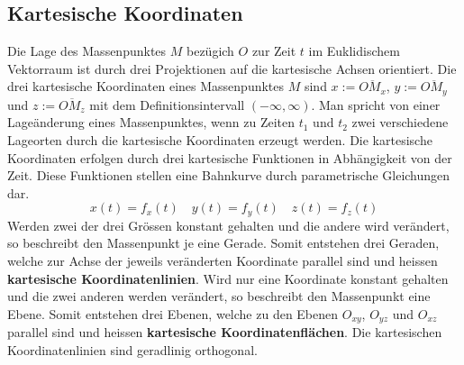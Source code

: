 \subsection{Kartesische Koordinaten}
Die Lage des Massenpunktes $M$ bezügich $O$ zur Zeit $t$ im Euklidischem Vektorraum ist durch drei Projektionen auf die kartesische Achsen orientiert. Die drei kartesische Koordinaten eines Massenpunktes $M$ sind $x:=\overline{OM_x}$, $y:=\overline{OM_y}$ und $z:=\overline{OM_z}$ mit dem Definitionsintervall $\left(-\infty, \infty\right)$.
\newline\newline
Man spricht von einer Lageänderung eines Massenpunktes, wenn zu Zeiten $t_1$ und $t_2$ zwei verschiedene Lageorten durch die kartesische Koordinaten erzeugt werden. Die kartesische Koordinaten erfolgen durch drei kartesische Funktionen in Abhängigkeit von der Zeit. Diese Funktionen stellen eine Bahnkurve durch parametrische Gleichungen dar.
\begin{equation}
\boxed{x(t)=f_x(t)}\quad \boxed{y(t)=f_y(t)} \quad \boxed{z(t)=f_z(t)}
\end{equation}
Werden zwei der drei Grössen konstant gehalten und die andere wird verändert, so beschreibt den Massenpunkt je eine Gerade. Somit entstehen drei Geraden, welche zur Achse der jeweils veränderten Koordinate parallel sind und heissen \textbf{kartesische Koordinatenlinien}. 
\newline\newline
Wird nur eine Koordinate konstant gehalten und die zwei anderen werden verändert, so beschreibt den Massenpunkt eine Ebene. Somit entstehen drei Ebenen, welche zu den Ebenen $O_{xy}$, $O_{yz}$ und $O_{xz}$ parallel sind und heissen \textbf{kartesische Koordinatenflächen}. Die kartesischen Koordinatenlinien sind geradlinig orthogonal.
